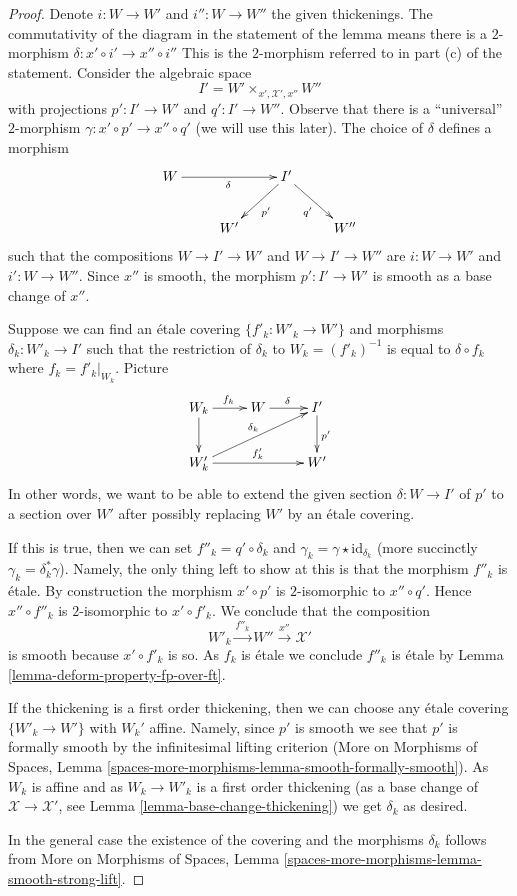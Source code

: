 \documentclass{stacks-project}
\theoremstyle{plain}
\theoremstyle{definition}
\theoremstyle{remark}
\numberwithin{equation}{subsection}
\begin{document}
\begin{proof}
Denote $i : W \to W'$ and $i'' : W \to W''$ the given thickenings.
The commutativity of the diagram in the statement of the lemma
means there is a $2$-morphism $\delta : x' \circ i' \to x'' \circ i''$
This is the $2$-morphism referred to in part (c) of the statement.
Consider the algebraic space
$$
I' = W' \times_{x', \mathcal{X}', x''} W''
$$
with projections $p' : I' \to W'$ and $q' : I' \to W''$.
Observe that there is a ``universal'' $2$-morphism
$\gamma : x' \circ p' \to x'' \circ q'$ (we will use this later).
The choice of $\delta$ defines a morphism
$$
\xymatrix{
W \ar[rr]_\delta & & I' \ar[ld]^{p'} \ar[rd]_{q'} \\
& W' & & W''
}
$$
such that the compositions $W \to I' \to W'$ and $W \to I' \to W''$
are $i : W \to W'$ and $i' : W \to W''$.
Since $x''$ is smooth, the morphism $p' : I' \to W'$ is smooth
as a base change of $x''$.

\medskip\noindent
Suppose we can find an \'etale covering $\{f'_k : W'_k \to W'\}$
and morphisms $\delta_k : W'_k \to I'$ such that the restriction
of $\delta_k$ to $W_k = (f'_k)^{-1}$ is equal to $\delta \circ f_k$
where $f_k = f'_k|_{W_k}$. Picture
$$
\xymatrix{
W_k \ar[r]^{f_k} \ar[d] & W \ar[r]^\delta & I' \ar[d]^{p'} \\
W'_k \ar[rr]^{f'_k} \ar[rru]^{\delta_k} & & W'
}
$$
In other words, we want to be able to extend the given section
$\delta : W \to I'$ of $p'$ to a section over $W'$ after possibly
replacing $W'$ by an \'etale covering.

\medskip\noindent
If this is true, then we can set $f''_k = q' \circ \delta_k$
and $\gamma_k = \gamma \star \text{id}_{\delta_k}$ (more succinctly
$\gamma_k = \delta_k^*\gamma$). Namely, the only thing left to show
at this is that the morphism $f''_k$ is \'etale.
By construction the morphism $x' \circ p'$ is $2$-isomorphic
to $x'' \circ q'$. Hence $x'' \circ f''_k$ is $2$-isomorphic
to $x' \circ f'_k$. We conclude that the composition
$$
W'_k \xrightarrow{f''_k} W'' \xrightarrow{x''} \mathcal{X}'
$$
is smooth because $x' \circ f'_k$ is so.
As $f_k$ is \'etale we conclude $f''_k$ is \'etale
by Lemma \ref{lemma-deform-property-fp-over-ft}.

\medskip\noindent
If the thickening is a first order thickening, then we can
choose any \'etale covering $\{W'_k \to W'\}$ with $W_k'$ affine.
Namely, since $p'$ is smooth we see that $p'$ is formally smooth by the
infinitesimal lifting criterion (More on Morphisms of Spaces, Lemma
\ref{spaces-more-morphisms-lemma-smooth-formally-smooth}).
As $W_k$ is affine and as $W_k \to W'_k$ is a first order thickening
(as a base change of $\mathcal{X} \to \mathcal{X}'$, see
Lemma \ref{lemma-base-change-thickening}) we get $\delta_k$ as
desired.

\medskip\noindent
In the general case the existence of the covering and the morphisms
$\delta_k$ follows from More on Morphisms of Spaces, Lemma
\ref{spaces-more-morphisms-lemma-smooth-strong-lift}.
\end{proof}
\end{document}
